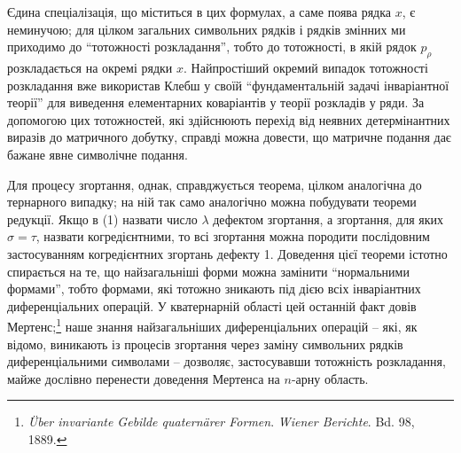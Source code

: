 \documentclass[11pt]{article}
\begin{document}
Єдина спеціалізація, що міститься в цих формулах, а саме поява рядка $x$, є неминучою; для цілком загальних символьних рядків і рядків змінних ми приходимо до ``тотожності розкладання'', тобто до тотожності, в якій рядок $p_\rho$ розкладається на окремі рядки $x$. Найпростіший окремий випадок тотожності розкладання вже використав Клебш у своїй ``фундаментальній задачі інваріантної теорії'' для виведення елементарних коваріантів у теорії розкладів у ряди. За допомогою цих тотожностей, які здійснюють перехід від неявних детермінантних виразів до матричного добутку, справді можна довести, що матричне подання дає бажане явне символічне подання.

Для процесу згортання, однак, справджується теорема, цілком аналогічна до тернарного випадку; на ній так само аналогічно можна побудувати теореми редукції. Якщо в (1) назвати число $\lambda$ дефектом згортання, а згортання, для яких $\sigma=\tau$, назвати когредієнтними, то всі згортання можна породити послідовним застосуванням когредієнтних згортань дефекту 1. Доведення цієї теореми істотно спирається на те, що найзагальніші форми можна замінити ``нормальними формами'', тобто формами, які тотожно зникають під дією всіх інваріантних диференціальних операцій. У кватернарній області цей останній факт довів Мертенс;\footnote{\emph{Über invariante Gebilde quaternärer Formen}. \emph{Wiener Berichte}. Bd. 98, 1889.} наше знання найзагальніших диференціальних операцій -- які, як відомо, виникають із процесів згортання через заміну символьних рядків диференціальними символами -- дозволяє, застосувавши тотожність розкладання, майже дослівно перенести доведення Мертенса на $n$-арну область.
\end{document}
